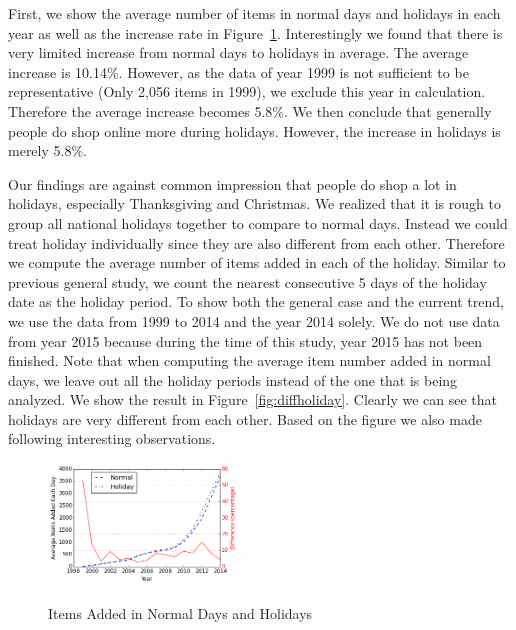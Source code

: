 First, we show the average number of items in normal days and holidays in each year as well as the increase rate in Figure~\ref{fig:holiday}. Interestingly we found that there is very limited increase from normal days to holidays in average. The average increase is 10.14\%. However, as the data of year 1999 is not sufficient to be representative (Only 2,056 items in 1999), we exclude this year in calculation. Therefore the average increase becomes 5.8\%. We then conclude that generally people do shop online more during holidays. However, the increase in holidays is merely 5.8\%. 

Our findings are against common impression that people do shop a lot in holidays, especially Thanksgiving and Christmas. We realized that it is rough to group all national holidays together to compare to normal days. Instead we could treat holiday individually since they are also different from each other. Therefore we compute the average number of items added in each of the holiday. Similar to previous general study, we count the nearest consecutive 5 days of the holiday date as the holiday period. To show both the general case and the current trend, we use the data from 1999 to 2014 and the year 2014 solely. We do not use data from year 2015 because during the time of this study, year 2015 has not been finished. Note that when computing the average item number added in normal days, we leave out all the holiday periods instead of the one that is being analyzed. We show the result in Figure~\ref{fig:diffholiday}. Clearly we can see that holidays are very different from each other. Based on the figure we also made following interesting observations.

\begin{figure}[t]
\centering
  \caption{Items Added in Normal Days and Holidays}{}
  \label{fig:holiday}
  \centering
    \includegraphics[width=0.45\textwidth]{holiday.png}
\end{figure}

